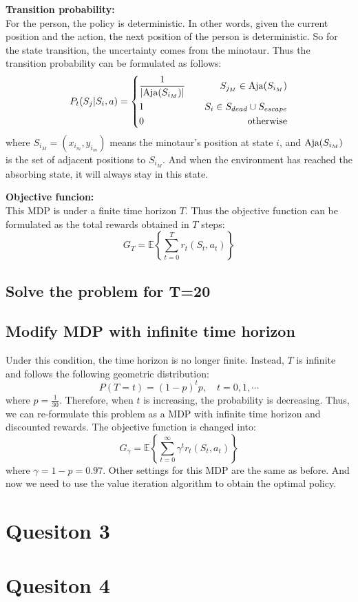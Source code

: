 \documentclass{article}
\begin{document}
\textbf{Transition probability:} \\
For the person, the policy is deterministic. In other words, given the current position and the action, the next position of the person is deterministic.
So for the state transition, the uncertainty comes from the minotaur. Thus the transition probability can be formulated as follows:
$$P_t(S_j|S_i,a)=\left\{\begin{aligned}
  &\frac{1}{|\textup{Aja}(S_{i_M})|} \quad &S_{j_M}\in \textup{Aja}(S_{i_M}) \\
  &1 \quad &S_i\in S_{dead}\cup S_{escape} \\
  &0 \quad &\textup{otherwise}
\end{aligned}\right.$$
where $S_{i_M}=(x_{i_m},y_{i_m})$ means the minotaur's position at state $i$, and $\textup{Aja}(S_{i_M})$ is the set of adjacent positions to $S_{i_M}$.
And when the environment has reached the absorbing state, it will always stay in this state.
\newline

\textbf{Objective funcion:} \\
This MDP is under a finite time horizon $T$. Thus the objective function can be formulated as the total rewards obtained in $T$ steps:
$$G_T=\mathbb{E}\left\{\sum_{t=0}^T r_t(S_t,a_t)\right\}$$

\subsection{Solve the problem for T=20}

\subsection{Modify MDP with infinite time horizon}
Under this condition, the time horizon is no longer finite. Instead, $T$ is infinite and follows the following geometric distribution:
$$P(T=t)=(1-p)^tp, \quad t=0,1,\cdots$$ 
where $p=\frac{1}{30}$. Therefore, when $t$ is increasing, the probability is decreasing. 
Thus, we can re-formulate this problem as a MDP with infinite time horizon and discounted rewards. The objective function is changed into:
$$G_{\gamma}=\mathbb{E}\left\{\sum_{t=0}^{\infty}\gamma^t r_t(S_t,a_t)\right\}$$
where $\gamma=1-p=0.97$.
Other settings for this MDP are the same as before. And now we need to use the value iteration algorithm to obtain the optimal policy.
  

\section{Quesiton 3}

\section{Quesiton 4}
\end{document}
